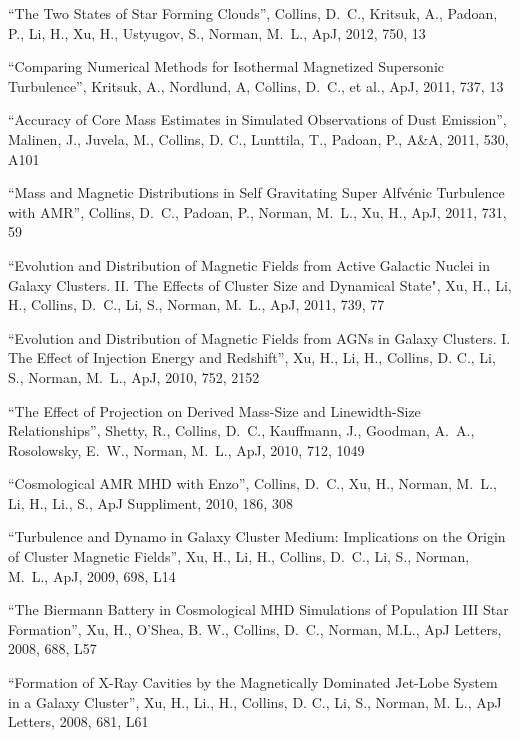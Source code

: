 \medskip
\noindent
``The Two States of Star Forming Clouds'', 
Collins, D.~C., Kritsuk, A., Padoan, P., Li, H., Xu, H., Ustyugov, S., Norman, M.~L.,
ApJ, 2012, 750, 13


\medskip
\noindent
``Comparing Numerical Methods for Isothermal Magnetized Supersonic Turbulence'', 
Kritsuk, A., Nordlund, A, Collins, D.~C., et al.,
ApJ, 2011, 737, 13

\medskip
\noindent
``Accuracy of Core Mass Estimates in Simulated Observations of Dust Emission'', 
Malinen, J., Juvela, M., Collins, D. C., Lunttila, T., Padoan, P.,
A\&A, 2011, 530, A101

\medskip
\noindent
``Mass and Magnetic Distributions in Self Gravitating Super Alfv\' enic Turbulence with AMR'', 
Collins, D.~C., Padoan, P., Norman, M.~L., Xu, H.,
ApJ, 2011, 731, 59

\medskip
\noindent
``Evolution and Distribution of Magnetic Fields from Active Galactic Nuclei in Galaxy Clusters. II. The Effects of Cluster Size and Dynamical State",
Xu, H., Li, H., Collins, D.~C., Li, S., Norman, M.~L.,
ApJ, 2011, 739, 77

\medskip
\noindent
``Evolution and Distribution of Magnetic Fields from AGNs in Galaxy Clusters.  I.  The Effect of Injection Energy and Redshift'', 
Xu, H., Li, H., Collins, D. C., Li, S., Norman, M.~L.,
ApJ, 2010, 752, 2152

\medskip
\noindent
``The Effect of Projection on Derived Mass-Size and Linewidth-Size Relationships'', 
Shetty, R., Collins, D.~C.,  Kauffmann, J.,  Goodman, A.~A.,  Rosolowsky, E.~W.,  Norman, M.~L., 
ApJ, 2010, 712, 1049

\medskip
\noindent
``Cosmological AMR MHD with Enzo'', 
Collins, D.~C., Xu, H., Norman, M.~L., Li, H., Li., S.,
ApJ Suppliment, 2010, 186, 308

\medskip
\noindent
``Turbulence and Dynamo in Galaxy Cluster Medium: Implications on the Origin of Cluster Magnetic Fields'',
Xu, H., Li, H., Collins, D.~C., Li, S., Norman, M.~L.,
ApJ, 2009, 698, L14

\medskip
\noindent
``The Biermann Battery in Cosmological MHD Simulations of Population III Star Formation'',
Xu, H., O'Shea, B. W., Collins, D.~C., Norman, M.L.,
ApJ Letters, 2008, 688, L57  

\medskip
\noindent
``Formation of X-Ray Cavities by the Magnetically Dominated Jet-Lobe System in a Galaxy Cluster'',
Xu, H., Li., H., Collins, D. C., Li, S., Norman, M. L.,
ApJ Letters, 2008, 681, L61 

